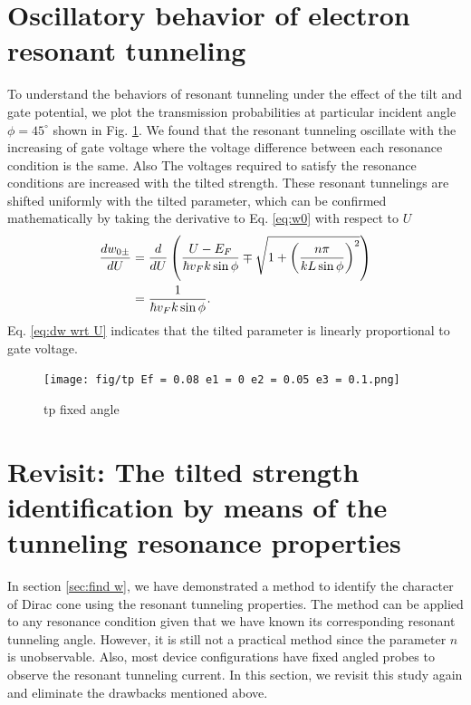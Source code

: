 \section{Oscillatory behavior of electron resonant tunneling} \label{sec:oscillation}
    To understand the behaviors of resonant tunneling under the effect of the tilt and gate potential, 
    we plot the transmission probabilities at particular incident angle $\phi = 45^{\circ}$ shown in Fig. \ref{fig:tp 45 deg}.
    We found that the resonant tunneling oscillate with the increasing of gate voltage where the voltage difference between each resonance condition is the same.
    Also The voltages required to satisfy the resonance conditions are increased with the tilted strength.
    These resonant tunnelings are shifted uniformly with the tilted parameter, which can be confirmed mathematically by taking the derivative to Eq. \ref{eq:w0} with respect to $U$
    \begin{align} \label{eq:dw wrt U}
        \frac{d w_{0\pm}}{dU} &= \frac{d}{dU} \left(\frac{U-E_F}{\hbar v_F k \sin{\phi}}\mp \sqrt{1+\left(\frac{n \pi}{k L \sin{\phi}}\right)^2}\right) \notag \\
                              &= \frac{1}{\hbar v_F k \sin{\phi}}.
    \end{align}
    Eq. \ref{eq:dw wrt U} indicates that the tilted parameter is linearly proportional to gate voltage.
    \begin{figure}[H]
        \centering
            \texttt{[image: fig/tp Ef = 0.08 e1 = 0 e2 = 0.05 e3 = 0.1.png]}
            \caption{tp fixed angle}
        \label{fig:tp 45 deg}
    \end{figure}

\section{Revisit: The tilted strength identification by means of the tunneling resonance properties} \label{sec:find w 2}
    In section \ref{sec:find w}, we have demonstrated a method to identify the character of Dirac cone using the resonant tunneling properties.
    The method can be applied to any resonance condition given that we have known its corresponding resonant tunneling angle.
    However, it is still not a practical method since the parameter $n$ is unobservable.
    Also, most device configurations have fixed angled probes to observe the resonant tunneling current.
    In this section, we revisit this study again and eliminate the drawbacks mentioned above.\\
    
